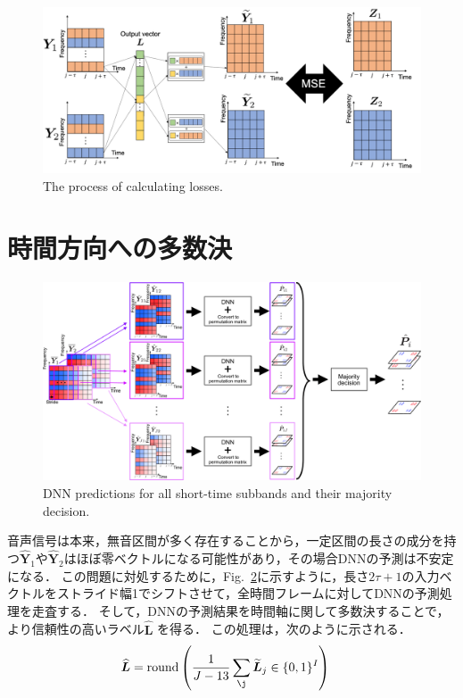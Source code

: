 \begin{figure}[t]
    \begin{center}
        \includegraphics[width=1.0\columnwidth]{figures/loss.pdf}
    \end{center}
    \vspace{-8pt}
	\caption{The process of calculating losses.}
	\label{fig:loss}
\end{figure}


\section{時間方向への多数決}
\label{sec:maj}
\begin{figure}[t]
    \begin{center}
        \includegraphics[width=0.9\columnwidth]{figures/majority.pdf}
    \end{center}
    \vspace{-15pt}
	\caption{DNN predictions for all short-time subbands and their majority decision.}
	\label{fig:majority}
	\vspace{-8pt}   %
\end{figure}
音声信号は本来，無音区間が多く存在することから，一定区間の長さの成分を持つ$\widehat{\bm{Y}}_1$や$\widehat{\bm{Y}}_2$はほぼ零ベクトルになる可能性があり，その場合DNNの予測は不安定になる．
この問題に対処するために，Fig.~\ref{fig:majority}に示すように，長さ$2\tau+1$の入力ベクトルをストライド幅1でシフトさせて，全時間フレームに対してDNNの予測処理を走査する．
そして，DNNの予測結果を時間軸に関して多数決することで，より信頼性の高いラベル$\widehat{\bm{L}}$ を得る．
この処理は，次のように示される．
\begin{align}
    \widehat{\bm{L}} &= \mathrm{round} \left(\frac{1}{J-13} \sum_{\j} \widetilde{\bm{L}}_{j} \in \{0, 1\}^{I} \right)
\end{align}

